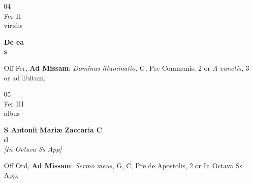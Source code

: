 \documentclass[10pt, openany]{book}
\begin{document}
        \begin{center}
            \begin{minipage}{3.5in}
                \vspace{2em}
                \begin{minipage}{0.5in}
                    {\Huge 04} \\
                    {\normalsize Fer II} \\
                    {\normalsize viridis}
                \end{minipage}
                \begin{minipage}{3.0in}
                    \textbf{ \large De ea \\
                    \textnormal{\normalsize s}} \\ 
                \end{minipage}
                \begin{justify}Off Fer, \textbf{Ad Missam}: \textit{Dominus illuminatio,} G, Pre Communis, 2 or \textit{A cunctis,} 3 or ad libitum,   
                \end{justify}
            \end{minipage}
        \end{center}
    
        \begin{center}
            \begin{minipage}{3.5in}
                \vspace{2em}
                \begin{minipage}{0.5in}
                    {\Huge 05} \\
                    {\normalsize Fer III} \\
                    {\normalsize albus}
                \end{minipage}
                \begin{minipage}{3.0in}
                    \textbf{ \large S Antonii Mariæ Zaccaria C \\
                    \textnormal{\normalsize d}} \\ \textit{[In Octava Ss App]} \\ 
                \end{minipage}
                \begin{justify}Off Ord, \textbf{Ad Missam}: \textit{Sermo meus,} G, C, Pre de Apostolis, 2 or In Octava Ss App,   
                \end{justify}
            \end{minipage}
        \end{center}
    
\end{document}
